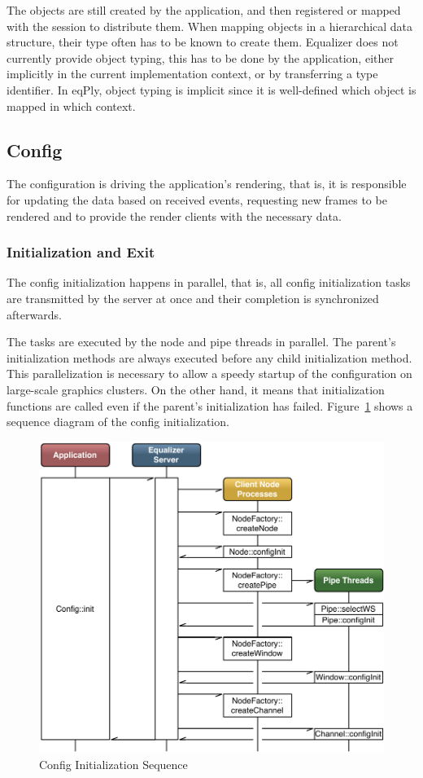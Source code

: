 \documentclass[10pt,a4]{scrartcl}
\newcommand{\fig}[1]{Figure~\ref{#1}}
\begin{document}
The objects are still created by the application, and then registered or
mapped with the session to distribute them. When mapping
objects in a hierarchical data structure, their type often has to be
known to create them. Equalizer does not currently provide
object typing, this has to be done by the application, either implicitly
in the current implementation context, or by transferring a type
identifier. In \textsf{eqPly}, object typing is implicit since it is
well-defined which object is mapped in which context.


\subsection{Config}

The configuration is driving the application's rendering, that is, it is
responsible for updating the data based on received events, requesting
new frames to be rendered and to provide the render clients with the
necessary data.

\subsubsection{Initialization and Exit}

The config initialization happens in parallel, that is, all config
initialization tasks are transmitted by the server at once and their
completion is synchronized afterwards. 

The tasks are executed by the node and pipe threads in parallel. The parent's
initialization methods are always executed before any child initialization
method. This parallelization is necessary to allow a speedy startup of the
configuration on large-scale graphics clusters. On the other hand, it means that
initialization functions are called even if the parent's initialization has
failed. \fig{fConfigInit} shows a sequence diagram of the config initialization.
\begin{figure}[ht!]\center
  \includegraphics[width=.9\textwidth]{images/configInit.pdf}
  {\caption{\label{fConfigInit}Config Initialization Sequence}}
\end{figure}
\end{document}
